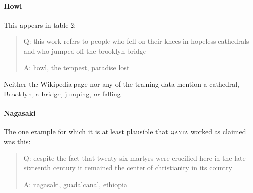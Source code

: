 \documentclass[12pt]{article}
\begin{document}
% 







\paragraph{Howl} This appears in table 2:
\begin{quote}
Q: this work refers to people who fell on their
  knees in hopeless cathedrals and who jumped
  off the brooklyn bridge

A: howl, the tempest, paradise lost
\end{quote}

Neither the Wikipedia page nor any of the training data
mention a cathedral, Brooklyn, a bridge, jumping, or falling.



\paragraph{Nagasaki}
The one example for which it is at least plausible that \textsc{qanta}
worked as claimed was this:
\begin{quote}
Q: despite the fact that twenty six martyrs were
  crucified here in the late sixteenth century it
  remained the center of christianity in its country

A: nagasaki, guadalcanal, ethiopia
\end{quote}
\end{document}
